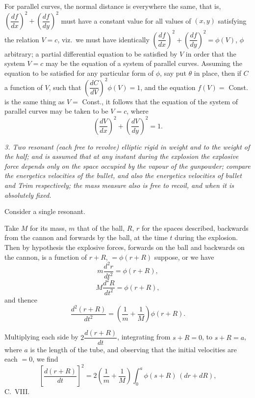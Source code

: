 \documentclass[11pt,a4paper]{article}
\theoremstyle{plain}
\theoremstyle{definition}
\begin{document}
For parallel curves, the normal distance is everywhere the same, that is, $\left(\dfrac{df}{dx}\right)^2 + \left(\dfrac{df}{dy}\right)^2$
must have a constant value for all values of $(x, y)$ satisfying the relation $V = c$, viz.\
we must have identically $\left(\dfrac{df}{dx}\right)^2 + \left(\dfrac{df}{dy}\right)^2 = \phi(V)$, $\phi$ arbitrary; a partial differential equation to be satisfied by $V$ in order that the system $V = c$ may be the equation of a system of parallel curves. Assuming the equation to be satisfied for any particular form of $\phi$,
say put $\theta$ in place, then if $C$ a function of $V$, such that $\left(\dfrac{dC}{dV}\right)^2 \phi(V) = 1$, and
the equation $f(V) = $ Const. is the same thing as $V = $ Const., it follows that the
equation of the system of parallel curves may be taken to be $V = c$, where
\[
\left(\frac{dV}{dx}\right)^2 + \left(\frac{dV}{dy}\right)^2 = 1.
\]

\textit{3. Two resonant (each free to revolve) elliptic rigid in weight and to the weight of
the half; and is assumed that at any instant during the explosion the explosive force
depends only on the space occupied by the vapour of the gunpowder; compare the
energetics velocities of the bullet, and also the energetics velocities of bullet and Trim respectively;
the mass measure also is free to recoil, and when it is absolutely fixed.}

Consider a single resonant.

Take $M$ for its mass, $m$ that of the ball, $R$, $r$ for the spaces described, backwards from the cannon and forwards by the ball, at the time $t$ during the explosion. Then
by hypothesis the explosive forces, forwards on the ball and backwards on
the cannon, is a function of $r + R$, $= \phi(r + R)$ suppose, or we have
\[
m\frac{d^2 r}{dt^2} = \phi(r + R),
\]
\[
M\frac{d^2 R}{dt^2} = \phi(r + R),
\]
and thence
\[
\frac{d^2(r + R)}{dt^2} = \left(\frac{1}{m} + \frac{1}{M}\right)\phi(r + R).
\]

Multiplying each side by $2\dfrac{d(r + R)}{dt}$, integrating from $s + R = 0$, to $s + R = a$, where $a$
is the length of the tube, and observing that the initial velocities are each $= 0$, we find
\[
\left[\frac{d(r + R)}{dt}\right]^2 = 2\left(\frac{1}{m} + \frac{1}{M}\right)\int_0^a \phi(s + R)\,(d r + dR),
\]
\bigskip
\hfill{\small C.\ VIII.}
\end{document}
